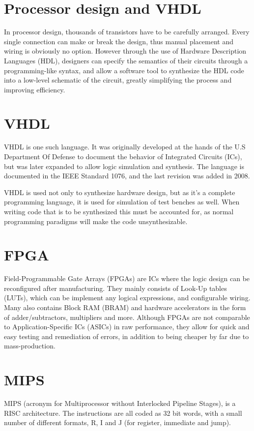 \section{Processor design and VHDL}
In processor design, thousands of transistors have to be carefully arranged.
Every single connection can make or break the design, thus manual placement and
wiring is obviously no option.  However through the use of Hardware Description
Languages (HDL), designers can specify the semantics of their circuits through a
programming-like syntax, and allow a software tool to synthesize the HDL code
into a low-level schematic of the circuit, greatly simplifying the process and
improving efficiency.

\section{VHDL}
VHDL is one such language.  It was originally developed at the hands of the U.S
Department Of Defense to document the behavior of Integrated Circuits (ICs), but
was later expanded to allow logic simulation and synthesis. The language is
documented in the IEEE Standard 1076, and the last revision was added in
2008.\cite{ieee-1076}

VHDL is used not only to synthesize hardware design, but as it's a complete
programming language, it is used for simulation of test benches as well. When
writing code that is to be synthesized this must be accounted for, as normal
programming paradigms will make the code unsynthesizable.


\section{FPGA}
Field-Programmable Gate Arrays (FPGAs) are ICs where the logic design can be
reconfigured after manufacturing.  They mainly consists of Look-Up tables
(LUTs), which can be implement any logical expressions, and configurable wiring.
Many also contains Block RAM (BRAM) and hardware accelerators in the form of
adder/subtractors, multipliers and more.  Although FPGAs are not comparable to
Application-Specific ICs (ASICs) in raw performance, they allow for quick and
easy testing and remediation of errors, in addition to being cheaper by far due
to mass-production.


\section{MIPS}
MIPS (acronym for Multiprocessor without Interlocked Pipeline Stages), is a RISC
architecture. The instructions are all coded as 32 bit words, with a small
number of different formats, R, I and J (for register, immediate and jump).\cite{mips-lecture}

